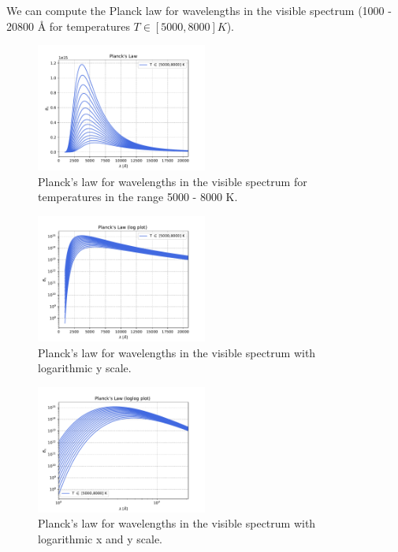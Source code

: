 \documentclass[a4paper,11.5pt,]{article}
\begin{document}
\begin{multicols}{2}
We can compute the Planck law for wavelengths in the visible spectrum (1000 - 20800 Å for temperatures $T \in [5000, 8000] K$). 

\begin{figure}[H]
	\centering
	\includegraphics[width=0.5\textwidth]{SSA/figures/planck.pdf}
	\caption{Planck's law for wavelengths in the visible spectrum for temperatures in the range 5000 - 8000 K.}
	\label{fig:11}
\end{figure}

\begin{figure}[H]
	\centering
	\includegraphics[width=0.5\textwidth]{SSA/figures/plancklog.pdf}
	\caption{Planck's law for wavelengths in the visible spectrum with logarithmic y scale.}
	\label{fig:12}
\end{figure}

\begin{figure}[H]
	\centering
	\includegraphics[width=0.5\textwidth]{SSA/figures/planckloglog.pdf}
	\caption{Planck's law for wavelengths in the visible spectrum with logarithmic x and y scale.}
	\label{fig:12}
\end{figure}





\end{multicols}
\end{document}
